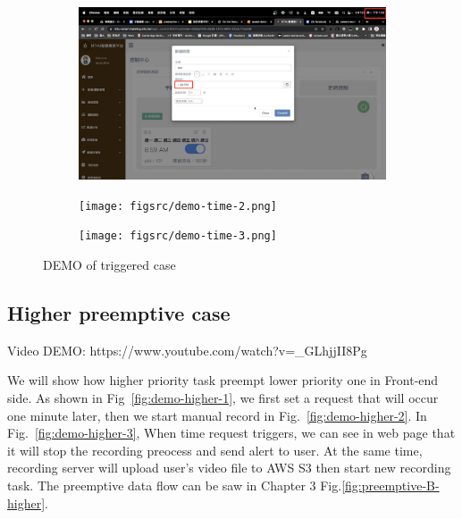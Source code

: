 \begin{figure}[H]
    \centering
    \begin{subfigure}{\textwidth}
        \includegraphics[width=\textwidth]{figsrc/demo-time-1.png}
        \label{fig:demo-time-1}
    \end{subfigure}
\end{figure}


\begin{figure}[H]
    \ContinuedFloat
    \centering
    \begin{subfigure}{\textwidth}
        \texttt{[image: figsrc/demo-time-2.png]}
        \label{fig:demo-time-2}
    \end{subfigure}
\end{figure}

\begin{figure}[H]
    \ContinuedFloat
    \centering
    \begin{subfigure}{\textwidth}
        \texttt{[image: figsrc/demo-time-3.png]}
        \label{fig:demo-time-3}
    \end{subfigure}

    \caption{DEMO of triggered case}
    \label{fig:demo-time}
\end{figure}

\subsection{Higher preemptive case}
Video DEMO: https://www.youtube.com/watch?v=\_GLhjjII8Pg

We will show how higher priority task preempt lower priority one in Front-end side. As shown in Fig~\ref{fig:demo-higher-1}, we first set a request that will occur one minute later, then we start manual record in Fig.~\ref{fig:demo-higher-2}. In Fig.~\ref{fig:demo-higher-3}, When time request triggers, we can see in web page that it will stop the recording preocess and send alert to user. At the same time, recording server will upload user's video file to AWS S3 then start new recording task. The preemptive data flow can be saw in Chapter 3 Fig.\ref{fig:preemptive-B-higher}.


